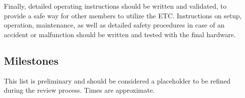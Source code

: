 \documentclass[conference]{IEEEtran} %
\begin{document}
  Finally, detailed operating instructions should be written and validated, to provide a safe way for other members to utilize the ETC. Instructions on setup, operation, maintenance, as well as detailed safety procedures in case of an accident or malfunction should be written and tested with the final hardware.

\subsection{Milestones}
\label{subsec:milestones}
  This list is preliminary and should be considered a placeholder to be refined during the review process. Times are approximate.
\end{document}

